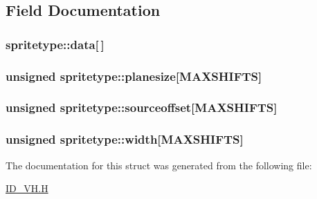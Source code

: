 \subsection{Field Documentation}
\hypertarget{structspritetype_a679b747ceb4db46a0f3928e176e2bb50}{
\subsubsection[{data}]{ {\bf spritetype::data}\mbox{[}$\,$\mbox{]}}}
\label{structspritetype_a679b747ceb4db46a0f3928e176e2bb50}
\hypertarget{structspritetype_a48a9eb892781841315b57b3911521930}{
\subsubsection[{planesize}]{\setlength{\rightskip}{0pt plus 5cm}unsigned {\bf spritetype::planesize}\mbox{[}MAXSHIFTS\mbox{]}}}
\label{structspritetype_a48a9eb892781841315b57b3911521930}
\hypertarget{structspritetype_a646d4271d08201079e11fe62c35cf158}{
\subsubsection[{sourceoffset}]{\setlength{\rightskip}{0pt plus 5cm}unsigned {\bf spritetype::sourceoffset}\mbox{[}MAXSHIFTS\mbox{]}}}
\label{structspritetype_a646d4271d08201079e11fe62c35cf158}
\hypertarget{structspritetype_a8f40c2748554d1ad92989a462f9dd89c}{
\subsubsection[{width}]{\setlength{\rightskip}{0pt plus 5cm}unsigned {\bf spritetype::width}\mbox{[}MAXSHIFTS\mbox{]}}}
\label{structspritetype_a8f40c2748554d1ad92989a462f9dd89c}


The documentation for this struct was generated from the following file:\begin{DoxyCompactItemize}
\item 
\hyperlink{ID__VH_8H}{ID\_\-VH.H}\end{DoxyCompactItemize}
